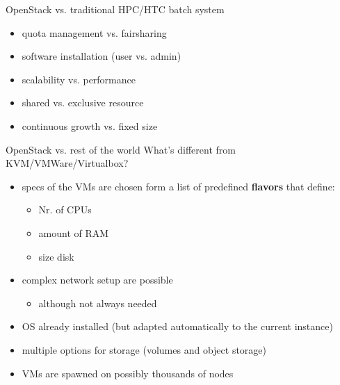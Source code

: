 \documentclass[english,serif,mathserif,usenames,dvipsnames]{beamer}
\begin{document}
\begin{frame}
  {OpenStack vs. traditional HPC/HTC batch system}

  \begin{itemize}
  \item quota management vs. fairsharing
  \item software installation (user vs. admin)
  \item scalability vs. performance
  \item shared vs. exclusive resource
  \item continuous growth vs. fixed size
  \end{itemize}
\end{frame}

\begin{frame}
  {OpenStack vs. rest of the world}
  What's different from KVM/VMWare/Virtualbox?

  \begin{itemize}
  \item specs of the VMs are chosen form a list of predefined
    \textbf{flavors} that define:
    \begin{itemize}
    \item Nr. of CPUs
    \item amount of RAM
    \item size disk
    \end{itemize}

  \item complex network setup are possible
    \begin{itemize}
    \item although not always needed
    \end{itemize}

  \item OS already installed (but adapted automatically to the current
    instance)

  \item multiple options for storage (volumes and object storage)

  \item VMs are spawned on possibly thousands of nodes

  \end{itemize}
\end{frame}
\end{document}
